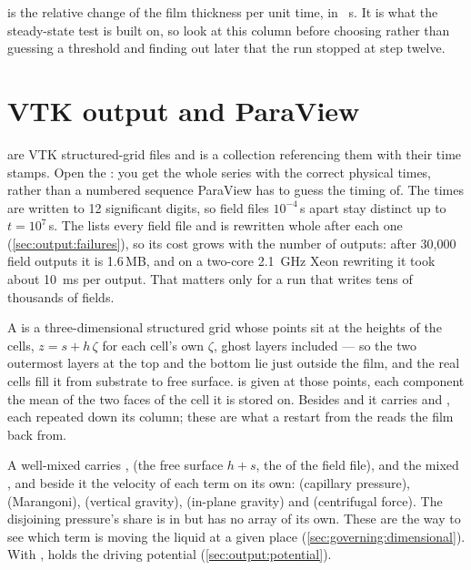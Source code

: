  is the relative change of the film thickness per unit time,
in \si{\per\second}. It is what the steady-state test is built on, so look at
this column before choosing  rather than
guessing a threshold and finding out later that the run stopped at step twelve.

\section{VTK output and ParaView}
\label{sec:output:vtk}

 are VTK structured-grid files and  is a
collection referencing them with their time stamps. Open the : you
get the whole series with the correct physical times, rather than a numbered
sequence ParaView has to guess the timing of. The times are written to 12
significant digits, so field files $10^{-4}$\,s apart stay distinct up to
$t = 10^{7}$\,s. The  lists every field file and is rewritten whole
after each one (\cref{sec:output:failures}), so its cost grows with the
number of outputs: after 30{,}000 field outputs it is 1.6\,MB, and on a
two-core \SI{2.1}{\giga\hertz} Xeon rewriting it took about
\SI{10}{\milli\second} per output. That matters only for a run that writes
tens of thousands of fields.

A   is a three-dimensional structured grid whose points
sit at the heights of the cells, $z = s + h\,\zeta$ for each cell's own
$\zeta$, ghost layers included --- so the two outermost layers at the top and
the bottom lie just outside the film, and the real cells fill it from substrate
to free surface.  is given at those points, each component the
mean of the two faces of the cell it is stored on. Besides  and
 it carries
 and , each repeated down its column; these
are what a restart from the  reads the film back from.

A well-mixed  carries ,  (the free surface
$h+s$, the  of the field file),  and the mixed
, and beside it the velocity of each term on its own:
 (capillary pressure),  (Marangoni), 
(vertical gravity),  (in-plane gravity) and 
(centrifugal force). The disjoining pressure's share is in 
but has no array of its own. These are the way to see which term is moving the
liquid at a given place (\cref{sec:governing:dimensional}). With ,  holds the driving potential
(\cref{sec:output:potential}).

